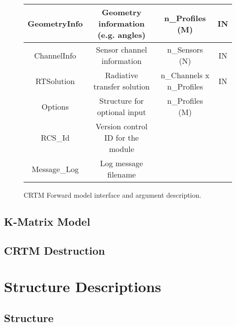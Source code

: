 \begin{figure}[htp]
{\begin{minipage}[b]{6.5in}
\begin{tabular}{c|c|c|c}
      \hline
      GeometryInfo       & Geometry information (e.g. angles)     & n\_Profiles (M)  & IN      \\
      \hline
      ChannelInfo        & Sensor channel information             & n\_Sensors (N)   & IN      \\
      \hline
      RTSolution         & Radiative transfer solution            & n\_Channels x n\_Profiles                 & IN      \\
      \hline
      Options            & Structure for optional input           & n\_Profiles (M)  &         \\
      \hline
      RCS\_Id            & Version control ID for the module      &                  &         \\
      \hline
      Message\_Log       & Log message filename                   &                  &         \\
    \end{tabular}
  \end{minipage}
  }
  \caption{CRTM Forward model interface and argument description.}
  \label{fig:fwd_interface}
\end{figure}


\subsection{K-Matrix Model}

\subsection{CRTM Destruction}

\section{Structure Descriptions}

\subsection{\Atmosphere{} Structure}


